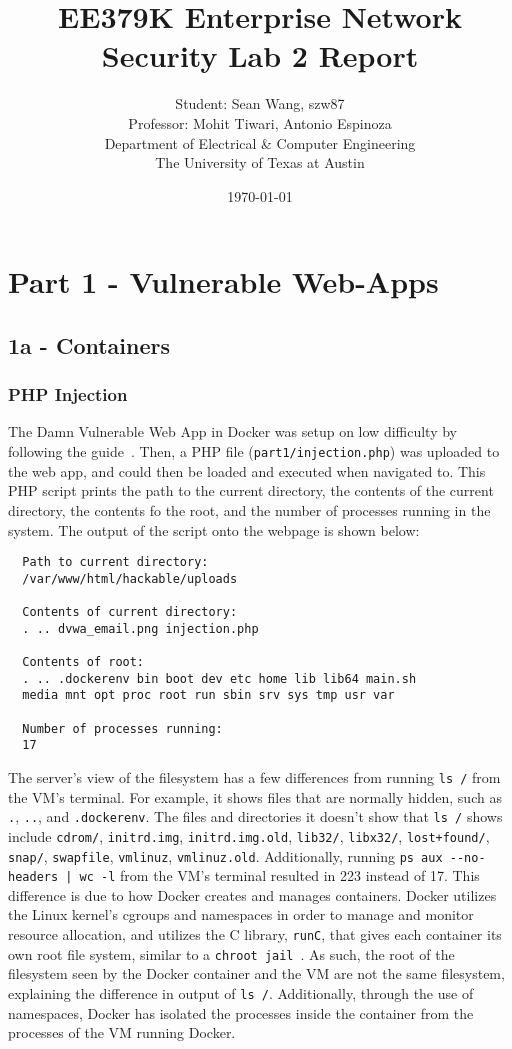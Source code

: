 \documentclass[11pt]{article}
\author{Student: Sean Wang, szw87 \\ Professor: Mohit Tiwari, Antonio Espinoza \\ Department of Electrical \& Computer Engineering \\ The University of Texas at Austin}
\date{\today}
\title{EE379K Enterprise Network Security Lab 2 Report}
\begin{document}
\maketitle
\section*{Part 1 - Vulnerable Web-Apps}
\subsection*{1a - Containers}
\subsubsection*{PHP Injection}
The Damn Vulnerable Web App in Docker was setup on low difficulty by following the guide~\cite{dvwa}. Then, a
PHP file (\verb|part1/injection.php|) was uploaded to the web app, and could then be loaded and executed when navigated to. This PHP script
prints the path to the current directory, the contents of the current directory, the contents fo the root, and the number of processes
running in the system. The output of the script onto the webpage is shown below:
\begin{verbatim}
  Path to current directory:
  /var/www/html/hackable/uploads
  
  Contents of current directory:
  . .. dvwa_email.png injection.php
  
  Contents of root:
  . .. .dockerenv bin boot dev etc home lib lib64 main.sh
  media mnt opt proc root run sbin srv sys tmp usr var
  
  Number of processes running:
  17
\end{verbatim}
The server's view of the filesystem has a few differences from running \verb|ls /| from the VM's terminal. For example, it shows files
that are normally hidden, such as \verb|.|, \verb|..|, and \verb|.dockerenv|. The files and directories it doesn't show that
\verb|ls /| shows include \verb|cdrom/|, \verb|initrd.img|, \verb|initrd.img.old|, \verb|lib32/|, \verb|libx32/|, \verb|lost+found/|,
\verb|snap/|, \verb|swapfile|, \verb|vmlinuz|, \verb|vmlinuz.old|. Additionally, running \verb=ps aux --no-headers | wc -l= from the
VM's terminal resulted in 223 instead of 17. This difference is due to how Docker creates and manages containers. Docker utilizes the
Linux kernel's cgroups and namespaces in order to manage and monitor resource allocation, and utilizes the C library, \verb|runC|,
that gives each container its own root file system, similar to a \verb|chroot jail|~\cite{codementor,demystify}. As such, the root of
the filesystem seen by the Docker container and the VM are not the same filesystem, explaining the difference in output of \verb|ls /|.
Additionally, through the use of namespaces, Docker has isolated the processes inside the container from the processes of the VM
running Docker.
\end{document}

